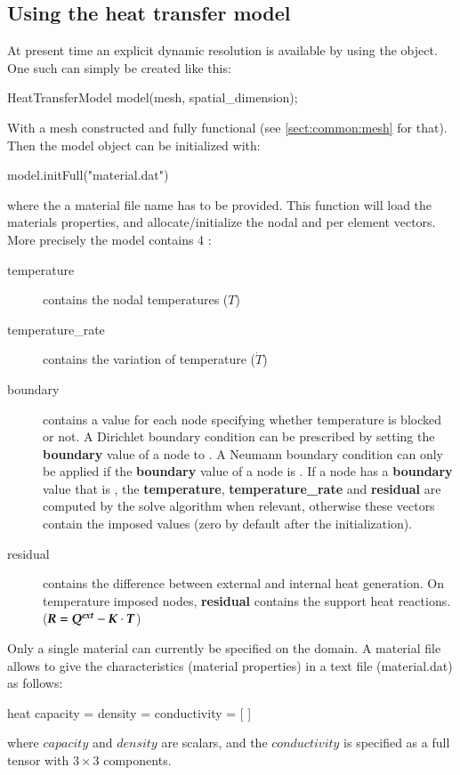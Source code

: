 \subsection{Using the heat transfer model}
At present time an explicit dynamic resolution is available by
using the   object.
One such can simply be created like this:
\begin{cpp}
  HeatTransferModel model(mesh, spatial_dimension);
\end{cpp}
With a mesh constructed and fully functional (see \ref{sect:common:mesh} for that).
Then the model object can be initialized with:
\begin{cpp}
  model.initFull("material.dat")
\end{cpp}
where the a material file name has to be provided. This function will load the materials 
properties, and allocate/initialize the nodal and per element vectors.
More precisely the model contains 4 :
\begin{description}
\item[temperature] contains the nodal temperatures ($T$) 
\item[temperature\_rate] contains the variation of temperature ($\dot{T}$) 
\item[boundary]  contains a    value for  each  node
  specifying  whether  temperature is  blocked  or  not. A  Dirichlet  boundary
  condition can be prescribed by setting the \textbf{boundary} value of a node 
  to  .  A Neumann boundary condition  can only be applied
  if the  \textbf{boundary} value of a node is  . If a
  node has a  \textbf{boundary} value  that is  , the
  \textbf{temperature},     \textbf{temperature\_rate} and
  \textbf{residual} are computed by the solve algorithm when relevant, otherwise
  these  vectors  contain   the  imposed  values  (zero  by   default  after  the
  initialization).
\item[residual] contains the difference between external and internal heat generation. On
  temperature imposed nodes,  \textbf{residual} contains the support heat reactions. ($\boldsymbol{R} = \boldsymbol{Q^{ext}} -\boldsymbol{K} \cdot \boldsymbol{T}$)
\end{description}

Only a single material can currently be specified on the domain. 
A material file allows to give the characteristics (material properties) in a text file (\eg material.dat) as follows:
\begin{cpp}
  heat %
  capacity = %
  density = %
  conductivity = [%
  ]
\end{cpp}
where $capacity$ and $density$ are scalars, and the $conductivity$ is specified as a full 
tensor with $3\times 3$ components.

